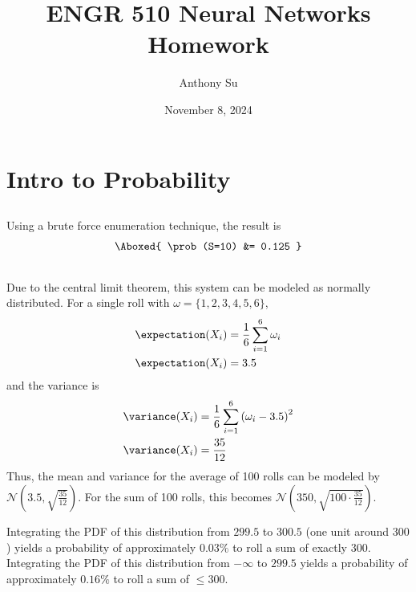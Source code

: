 \documentclass[11pt]{article}
\title{ENGR 510 Neural Networks Homework}
\author{Anthony Su}
\date{November 8, 2024}
\begin{document}
\thispagestyle{plain}
\maketitle


\section{Intro to Probability}

\subsection{}  %
Using a brute force enumeration technique, the result is
\begin{align*}
    \Aboxed{
        \prob(S=10) &= 0.125
    }
\end{align*}

\subsection{}  %
Due to the central limit theorem, this system can be modeled as normally
distributed. For a single roll with $\omega = \{1, 2, 3, 4, 5, 6\}$,
\begin{align*}
    \expectation (X_i) &= \frac{1}{6} \sum_{i=1}^{6} \omega_i \\
    \expectation (X_i) &= 3.5
\end{align*}
and the variance is
\begin{align*}
    \variance (X_i) &= \frac{1}{6} \sum_{i=1}^{6} \left( \omega_i - 3.5 \right)^2 \\
    \variance (X_i) &= \frac{35}{12}
\end{align*}
Thus, the mean and variance for the average of 100 rolls can be modeled by $\mathcal{N}\left(3.5, \sqrt{\frac{35}{12}}\right)$.
For the sum of 100 rolls, this becomes $\mathcal{N}\left(350, \sqrt{100 \cdot \frac{35}{12}}\right)$.

Integrating the PDF of this distribution from $299.5$ to $300.5$ (one unit around $300$)
yields a probability of approximately $0.03\%$ to roll a sum of exactly $300$.
Integrating the PDF of this distribution from $-\infty$ to $299.5$ yields a
probability of approximately $0.16\%$ to roll a sum of $\leq300$.
\end{document}
